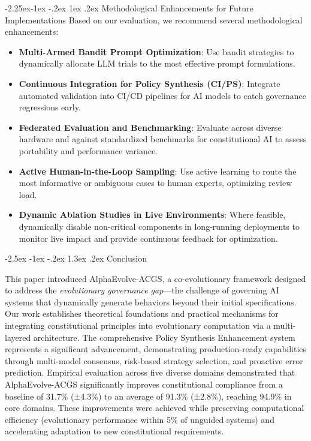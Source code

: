 \documentclass[manuscript,screen,9pt]{acmart}
\makeatletter
\renewcommand\section{\@startsection{section}{1}{\z@}%
  {-2.5ex \@plus -1ex \@minus -.2ex}%
  {1.3ex \@plus.2ex}%
  {\normalfont\Large\bfseries}}
\renewcommand\subsection{\@startsection{subsection}{2}{\z@}%
  {-2.25ex\@plus -1ex \@minus -.2ex}%
  {1ex \@plus .2ex}%
  {\normalfont\large\bfseries}}
\makeatother
\begin{document}
\subsection{Methodological Enhancements for Future Implementations}
\label{subsec:methodology_optimization} 
Based on our evaluation, we recommend several methodological enhancements:
\begin{itemize}[leftmargin=*,itemsep=1pt,parsep=1pt]
    \item \textbf{Multi-Armed Bandit Prompt Optimization}: Use bandit strategies to dynamically allocate LLM trials to the most effective prompt formulations.
    \item \textbf{Continuous Integration for Policy Synthesis (CI/PS)}: Integrate automated validation into CI/CD pipelines for AI models to catch governance regressions early.
    \item \textbf{Federated Evaluation and Benchmarking}: Evaluate across diverse hardware and against standardized benchmarks for constitutional AI to assess portability and performance variance.
    \item \textbf{Active Human-in-the-Loop Sampling}: Use active learning to route the most informative or ambiguous cases to human experts, optimizing review load.
    \item \textbf{Dynamic Ablation Studies in Live Environments}: Where feasible, dynamically disable non-critical components in long-running deployments to monitor live impact and provide continuous feedback for optimization.
\end{itemize}


\section{Conclusion}
\label{sec:conclusion}

This paper introduced AlphaEvolve-ACGS, a co-evolutionary framework designed to address the \textit{evolutionary governance gap}—the challenge of governing AI systems that dynamically generate behaviors beyond their initial specifications. Our work establishes theoretical foundations and practical mechanisms for integrating constitutional principles into evolutionary computation via a multi-layered architecture. The comprehensive Policy Synthesis Enhancement system represents a significant advancement, demonstrating production-ready capabilities through multi-model consensus, risk-based strategy selection, and proactive error prediction. Empirical evaluation across five diverse domains demonstrated that AlphaEvolve-ACGS significantly improves constitutional compliance from a baseline of 31.7\% (±4.3\%) to an average of 91.3\% (±2.8\%), reaching 94.9\% in core domains. These improvements were achieved while preserving computational efficiency (evolutionary performance within 5\% of unguided systems) and accelerating adaptation to new constitutional requirements.
\end{document}

